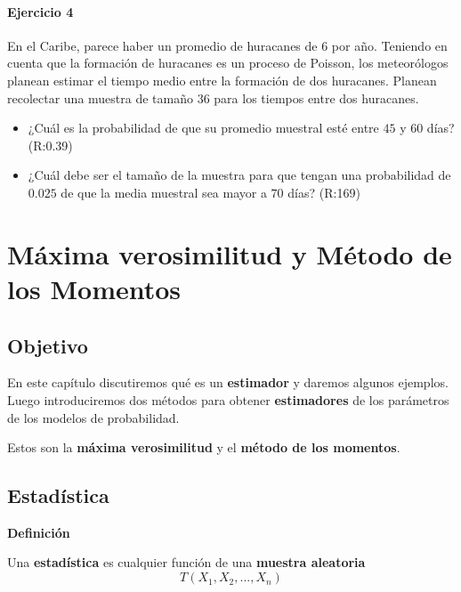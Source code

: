 \documentclass[
]{book}
\begin{document}
\hypertarget{ejercicio-4-3}{%
\subsubsection{Ejercicio 4}\label{ejercicio-4-3}}

En el Caribe, parece haber un promedio de huracanes de \(6\) por año. Teniendo en cuenta que la formación de huracanes es un proceso de Poisson, los meteorólogos planean estimar el tiempo medio entre la formación de dos huracanes. Planean recolectar una muestra de tamaño \(36\) para los tiempos entre dos huracanes.

\begin{itemize}
\item
  ¿Cuál es la probabilidad de que su promedio muestral esté entre \(45\) y \(60\) días? (R:0.39)
\item
  ¿Cuál debe ser el tamaño de la muestra para que tengan una probabilidad de \(0.025\) de que la media muestral sea mayor a \(70\) días? (R:169)
\end{itemize}

\hypertarget{muxe1xima-verosimilitud-y-muxe9todo-de-los-momentos}{%
\chapter{Máxima verosimilitud y Método de los Momentos}\label{muxe1xima-verosimilitud-y-muxe9todo-de-los-momentos}}

\hypertarget{objetivo-8}{%
\section{Objetivo}\label{objetivo-8}}

En este capítulo discutiremos qué es un \textbf{estimador} y daremos algunos ejemplos. Luego introduciremos dos métodos para obtener \textbf{estimadores} de los parámetros de los modelos de probabilidad.

Estos son la \textbf{máxima verosimilitud} y el \textbf{método de los momentos}.

\hypertarget{estaduxedstica-1}{%
\section{Estadística}\label{estaduxedstica-1}}

\textbf{Definición}

Una \textbf{estadística} es cualquier función de una \textbf{muestra aleatoria}
\[T(X_1,X_2, ..., X_n)\]
\end{document}
